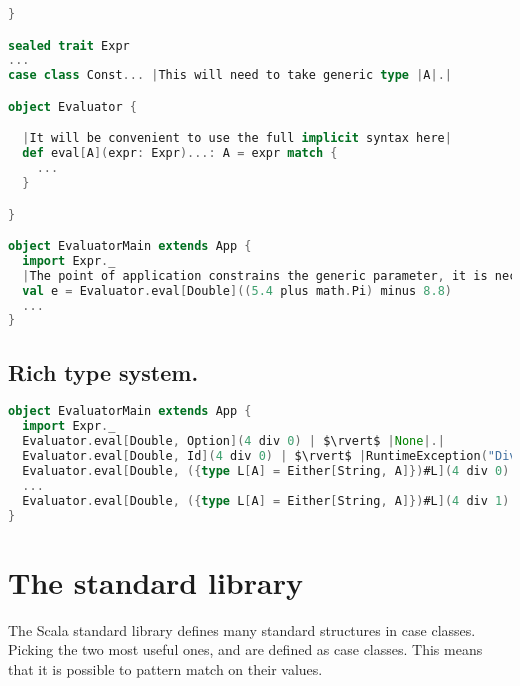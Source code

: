 \documentclass[10 pt]{article}
\begin{document}
\begin{example}
\begin{lstlisting}[caption={Flexible evaluator (with DSL)}, label={code:eepm2}, language=Scala, escapechar=|]
}

sealed trait Expr
...
case class Const... |This will need to take generic type |A|.|

object Evaluator {

  |It will be convenient to use the full implicit syntax here|
  def eval[A](expr: Expr)...: A = expr match {
    ...
  }

}

object EvaluatorMain extends App {
  import Expr._
  |The point of application constrains the generic parameter, it is necessary to specify the type |A|. in |eval|.|
  val e = Evaluator.eval[Double]((5.4 plus math.Pi) minus 8.8)
  ...
}
\end{lstlisting}
\end{example}

\subsection{Rich type system.}

\begin{example}

\begin{lstlisting}[caption={Flexible evaluator (with DSL)}, label={code:eepm2}, language=Scala, escapechar=|]
object EvaluatorMain extends App {
  import Expr._
  Evaluator.eval[Double, Option](4 div 0) | $\rvert$ |None|.|
  Evaluator.eval[Double, Id](4 div 0) | $\rvert$ |RuntimeException("Division by zero")|.|
  Evaluator.eval[Double, ({type L[A] = Either[String, A]})#L](4 div 0) | $\rvert$ |Left("Division by zero")|.|
  ...
  Evaluator.eval[Double, ({type L[A] = Either[String, A]})#L](4 div 1) | $\rvert$ |Right(4.0)|.|
}
\end{lstlisting}
\end{example}


\section{The standard library}
The Scala standard library defines many standard structures in case classes. Picking the two most useful ones,  and  are defined as case classes. This means that it is possible to pattern match on their values.
\end{document}
